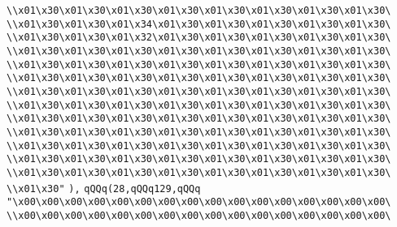 \verb|\\x01\x30\x01\x30\x01\x30\x01\x30\x01\x30\x01\x30\x01\x30\x01\x30\|\newline
\verb|\\x01\x30\x01\x30\x01\x34\x01\x30\x01\x30\x01\x30\x01\x30\x01\x30\|\newline
\verb|\\x01\x30\x01\x30\x01\x32\x01\x30\x01\x30\x01\x30\x01\x30\x01\x30\|\newline
\verb|\\x01\x30\x01\x30\x01\x30\x01\x30\x01\x30\x01\x30\x01\x30\x01\x30\|\newline
\verb|\\x01\x30\x01\x30\x01\x30\x01\x30\x01\x30\x01\x30\x01\x30\x01\x30\|\newline
\verb|\\x01\x30\x01\x30\x01\x30\x01\x30\x01\x30\x01\x30\x01\x30\x01\x30\|\newline
\verb|\\x01\x30\x01\x30\x01\x30\x01\x30\x01\x30\x01\x30\x01\x30\x01\x30\|\newline
\verb|\\x01\x30\x01\x30\x01\x30\x01\x30\x01\x30\x01\x30\x01\x30\x01\x30\|\newline
\verb|\\x01\x30\x01\x30\x01\x30\x01\x30\x01\x30\x01\x30\x01\x30\x01\x30\|\newline
\verb|\\x01\x30\x01\x30\x01\x30\x01\x30\x01\x30\x01\x30\x01\x30\x01\x30\|\newline
\verb|\\x01\x30\x01\x30\x01\x30\x01\x30\x01\x30\x01\x30\x01\x30\x01\x30\|\newline
\verb|\\x01\x30\x01\x30\x01\x30\x01\x30\x01\x30\x01\x30\x01\x30\x01\x30\|\newline
\verb|\\x01\x30\x01\x30\x01\x30\x01\x30\x01\x30\x01\x30\x01\x30\x01\x30\|\newline
\verb|\\x01\x30"|\newline
\verb|),|\newline
\verb|qQQq(28,qQQq129,qQQq|\newline
\verb|"\x00\x00\x00\x00\x00\x00\x00\x00\x00\x00\x00\x00\x00\x00\x00\x00\|\newline
\verb|\\x00\x00\x00\x00\x00\x00\x00\x00\x00\x00\x00\x00\x00\x00\x00\x00\|\newline
